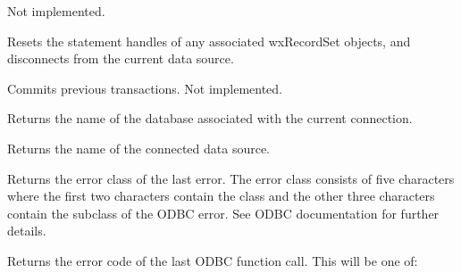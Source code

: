 
Not implemented.



Resets the statement handles of any associated wxRecordSet objects,
and disconnects from the current data source.



Commits previous transactions. Not implemented.



Returns the name of the database associated with the current connection.



Returns the name of the connected data source.



Returns the error class of the last error. The error class consists of
five characters where the first two characters contain the class
and the other three characters contain the subclass of the ODBC error.
See ODBC documentation for further details.



Returns the error code of the last ODBC function call. This will be one of:

\begin{twocollist}\itemsep=0pt
\end{twocollist}


